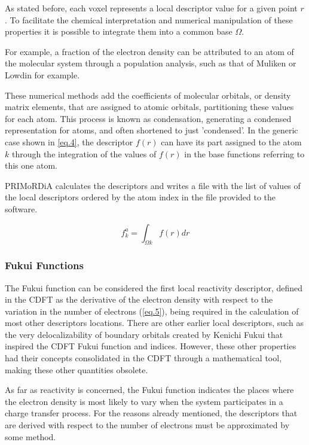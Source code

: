 \documentclass[a4paper,11pt]{refart}
\begin{document}
	As stated before, each voxel represents a local descriptor value for a given point $r$. To facilitate the chemical interpretation and numerical manipulation of these properties it is possible to integrate them into a common base $\Omega$. 

	For example, a fraction of the electron density can be attributed to an atom of the molecular system through a population analysis, such as that of Muliken or Lowdin for example. 

	These numerical methods add the coefficients of molecular orbitals, or density matrix elements, that are assigned to atomic orbitals, partitioning these values for each atom. This process is known as condensation, generating a condensed representation for atoms, and often shortened to just 'condensed'. In the generic case shown in \autoref{eq.4}, the descriptor $f(r)$ can have its part assigned to the atom $k$ through the integration of the values of $f(r)$ in the base functions referring to this one atom.

	PRIMoRDiA calculates the descriptors and writes a file with the list of values of the local descriptors ordered by the atom index in the file provided to the software.


	\begin{equation}
	f_k^{a} = \int_{\Omega k} f(r)dr
	\label{eq.4}
	\end{equation} 

	\subsubsection{Fukui Functions} 

	The Fukui function can be considered the first local reactivity descriptor, defined in the CDFT as the derivative of the electron density with respect to the variation in the number of electrons (\autoref{eq.5}), being required in the calculation of most other descriptors locations. There are other earlier local descriptors, such as the very delocalizability of boundary orbitals created by Kenichi Fukui that inspired the CDFT\cite{fukui1970theory} Fukui function and indices. However, these other properties had their concepts consolidated in the CDFT through a mathematical tool, making these other quantities obsolete.

	As far as reactivity is concerned, the Fukui function indicates the places where the electron density is most likely to vary when the system participates in a charge transfer process. For the reasons already mentioned, the descriptors that are derived with respect to the number of electrons must be approximated by some method. 
\end{document}
